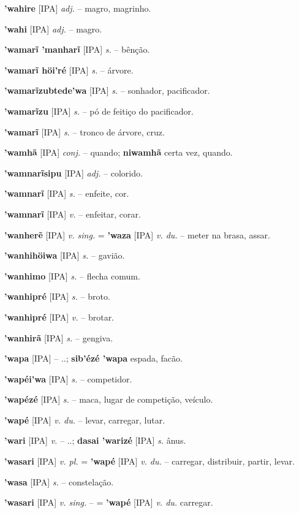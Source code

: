 \textbf{'wahire} [IPA] \textit{adj.} -- magro, magrinho.

\textbf{'wahi} [IPA] \textit{adj.} -- magro.

\textbf{'wamarĩ 'manharĩ} [IPA] \textit{s.} -- bênção.

\textbf{'wamarĩ höi'ré} [IPA] \textit{s.} -- árvore.

\textbf{'wamarĩzubtede'wa} [IPA] \textit{s.} -- sonhador, pacificador.

\textbf{'wamarĩzu} [IPA] \textit{s.} -- pó de feitiço do pacificador.

\textbf{'wamarĩ} [IPA] \textit{s.} -- tronco de árvore, cruz.

\textbf{'wamhã} [IPA] \textit{conj.} -- quando; \textbf{niwamhã} certa vez, quando.

\textbf{'wamnarĩsipu} [IPA] \textit{adj.} -- colorido.

\textbf{'wamnarĩ} [IPA] \textit{s.} -- enfeite, cor.

\textbf{'wamnarĩ} [IPA] \textit{v.} -- enfeitar, corar.

\textbf{'wanherẽ} [IPA] \textit{v. sing.} = \textbf{'waza} [IPA] \textit{v. du.} -- meter na brasa, assar.

\textbf{'wanhihöiwa} [IPA] \textit{s.} -- gavião.

\textbf{'wanhimo} [IPA] \textit{s.} -- flecha comum.

\textbf{'wanhipré} [IPA] \textit{s.} -- broto.

\textbf{'wanhipré} [IPA] \textit{v.} -- brotar.

\textbf{'wanhirã} [IPA] \textit{s.} -- gengiva.

\textbf{'wapa} [IPA] \textit{} -- ..; \textbf{sib'ézé 'wapa} espada, facão.

\textbf{'wapéi'wa} [IPA] \textit{s.} -- competidor.

\textbf{'wapézé} [IPA] \textit{s.} -- maca, lugar de competição, veículo.

\textbf{'wapé} [IPA] \textit{v. du.} -- levar, carregar, lutar.

\textbf{'wari} [IPA] \textit{v.} -- ..; \textbf{dasai 'warizé} [IPA] \textit{s.} ânus.

\textbf{'wasari} [IPA] \textit{v. pl.} = \textbf{'wapé} [IPA] \textit{v. du.} -- carregar, distribuir, partir, levar.

\textbf{'wasa} [IPA] \textit{s.} -- constelação.

\textbf{'wasari} [IPA] \textit{v. sing.} -- = \textbf{'wapé} [IPA] \textit{v. du.} carregar.

